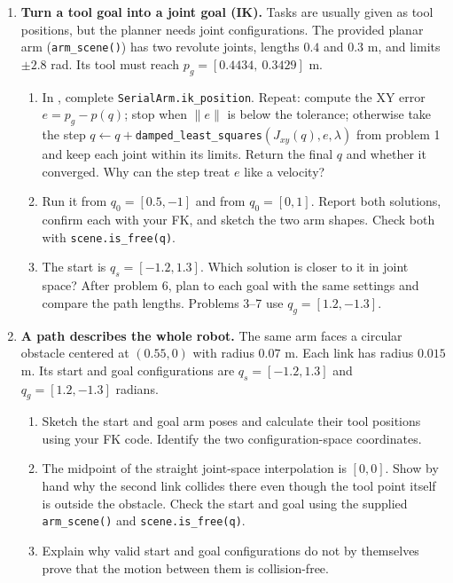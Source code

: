 \begin{enumerate}
\item \textbf{Turn a tool goal into a joint goal (IK).}
Tasks are usually given as tool positions, but the planner needs joint
configurations. The provided planar arm (\texttt{arm\_scene()}) has two
revolute joints, lengths $0.4$ and $0.3$ m, and limits $\pm2.8$ rad. Its
tool must reach $p_g=[0.4434,\ 0.3429]$ m.
\begin{enumerate}
\item In , complete
\texttt{SerialArm.ik\_position}. Repeat: compute the XY
error $e=p_g-p(q)$; stop when $\|e\|$ is below the tolerance; otherwise take
the step $q\leftarrow q+$\texttt{damped\_least\_squares}$(J_{xy}(q),e,\lambda)$
from problem 1 and keep each joint within its limits. Return the final $q$ and
whether it converged. Why can the step treat $e$ like a velocity?
\item Run it from $q_0=[0.5,-1]$ and from $q_0=[0,1]$. Report both
solutions, confirm each with your FK, and sketch the two arm shapes. Check
both with \texttt{scene.is\_free(q)}.
\item The start is $q_s=[-1.2,1.3]$. Which solution is closer to it in joint
space? After problem 6, plan to each goal with the same settings and compare
the path lengths. Problems 3--7 use $q_g=[1.2,-1.3]$.
\end{enumerate}

\item \textbf{A path describes the whole robot.}
The same arm faces a circular obstacle centered at $(0.55,0)$ with radius
$0.07$ m. Each link has radius $0.015$ m. Its start and goal configurations
are $q_s=[-1.2,1.3]$ and $q_g=[1.2,-1.3]$ radians.
\begin{enumerate}
\item Sketch the start and goal arm poses and calculate their tool positions
using your FK code. Identify the two configuration-space coordinates.
\item The midpoint of the straight joint-space interpolation is $[0,0]$.
Show by hand why the second link collides there even though the tool point
itself is outside the obstacle. Check the start and goal using the supplied
\texttt{arm\_scene()} and \texttt{scene.is\_free(q)}.
\item Explain why valid start and goal configurations do not by themselves
prove that the motion between them is collision-free.
\end{enumerate}


\end{enumerate}
